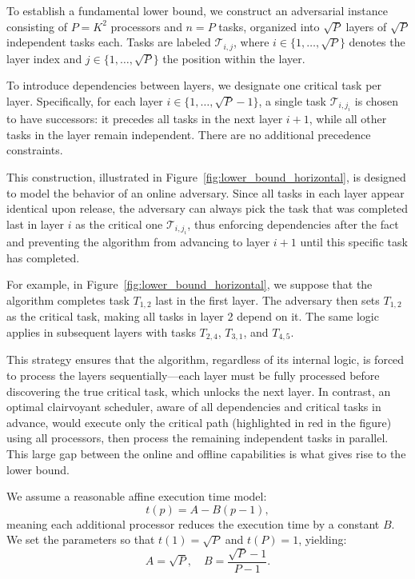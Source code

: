 \documentclass{article}
\newcommand\task{\mathcal{T}}
\begin{document}
To establish a fundamental lower bound, we construct an adversarial instance consisting of \( P = K^2 \) processors and \( n = P \) tasks, organized into \( \sqrt{P} \) layers of \( \sqrt{P} \) independent tasks each. Tasks are labeled \( \task_{i,j} \), where \( i \in \{1, \dots, \sqrt{P}\} \) denotes the layer index and \( j \in \{1, \dots, \sqrt{P}\} \) the position within the layer.

To introduce dependencies between layers, we designate one critical task per layer. Specifically, for each layer \( i \in \{1, \dots, \sqrt{P} - 1\} \), a single task \( \task_{i,j_i} \) is chosen to have successors: it precedes all tasks in the next layer \( i+1 \), while all other tasks in the layer remain independent. There are no additional precedence constraints.

This construction, illustrated in Figure~\ref{fig:lower_bound_horizontal}, is designed to model the behavior of an online adversary. Since all tasks in each layer appear identical upon release, the adversary can always pick the task that was completed last in layer \( i \) as the critical one \( \task_{i,j_i} \), thus enforcing dependencies after the fact and preventing the algorithm from advancing to layer \( i+1 \) until this specific task has completed.

For example, in Figure~\ref{fig:lower_bound_horizontal}, we suppose that the algorithm completes task \( T_{1,2} \) last in the first layer. The adversary then sets \( T_{1,2} \) as the critical task, making all tasks in layer 2 depend on it. The same logic applies in subsequent layers with tasks \( T_{2,4} \), \( T_{3,1} \), and \( T_{4,5} \).

This strategy ensures that the algorithm, regardless of its internal logic, is forced to process the layers sequentially—each layer must be fully processed before discovering the true critical task, which unlocks the next layer. In contrast, an optimal clairvoyant scheduler, aware of all dependencies and critical tasks in advance, would execute only the critical path (highlighted in red in the figure) using all processors, then process the remaining independent tasks in parallel. This large gap between the online and offline capabilities is what gives rise to the lower bound.


We assume a reasonable affine execution time model:
\[
t(p) = A - B(p - 1),
\]
meaning each additional processor reduces the execution time by a constant \( B \). We set the parameters so that \( t(1) = \sqrt{P} \) and \( t(P) = 1 \), yielding:
\[
A = \sqrt{P}, \quad B = \frac{\sqrt{P} - 1}{P - 1}.
\]
\end{document}
